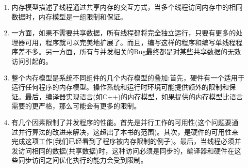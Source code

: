 \begin{enumerate}
\item 
内存模型描述了线程通过共享内存的交互方式，当多个线程访问内存中的相同数据时，内存模型是一组限制和保证。

\item 
一方面，如果不需要共享数据，所有线程都将完全独立运行，只要有更多的处理器可用，程序就可以完美地扩展了。而且，编写这样的程序和编写单线程程序差不多。另一方面，所有与并发相关的Bug最终都是对某些共享数据的无效访问引起的。

\item 
整个内存模型是系统不同组件的几个内存模型的叠加:首先，硬件有一个适用于运行任何程序的内存模型。操作系统和运行时环境可能提供额外的限制和保证。最后，编译器实现语言(如C++)的内存模型，如果提供的内存模型比语言需要的更严格，那么可能会有更多的限制。

\item
有几个因素限制了并发程序的性能。首先是并行工作的可用性(这个问题要通过并行算法的改进来解决，这超出了本书的范围)。其次，是硬件的可用性来完成这项工作(我们已经看到了程序被内存限制的例子)。最后，当线程必须并发访问相同的数据(共享数据)时，这种访问必须是同步的，编译器和硬件在这些同步访问之间优化执行的能力会受到限制。

\end{enumerate}